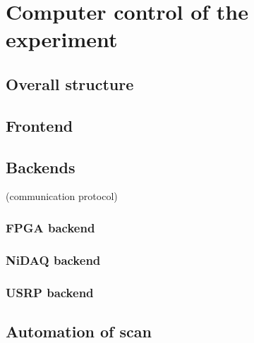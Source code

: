 
\chapter{Computer control of the experiment}

\section{Overall structure}

\section{Frontend}

\section{Backends}
(communication protocol)

\subsection{FPGA backend}

\subsection{NiDAQ backend}

\subsection{USRP backend}

\section{Automation of scan}
